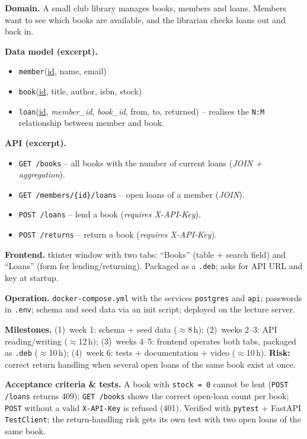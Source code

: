 \documentclass[11pt,a4paper]{article}
\begin{document}
\begin{beispielbox}
\textbf{Domain.} A small club library manages books, members and loans. Members
want to see which books are available, and the librarian checks loans out and
back in.

\medskip
\textbf{Data model (excerpt).}
\begin{itemize}[leftmargin=1.4em, topsep=2pt]
  \item \texttt{member}(\underline{id}, name, email)
  \item \texttt{book}(\underline{id}, title, author, isbn, stock)
  \item \texttt{loan}(\underline{id}, \emph{member\_id}, \emph{book\_id},
        from, to, returned) -- realises the \texttt{N:M} relationship between
        member and book.
\end{itemize}

\textbf{API (excerpt).}
\begin{itemize}[leftmargin=1.4em, topsep=2pt]
  \item \texttt{GET /books} -- all books with the number of current loans
        (\emph{JOIN + aggregation}).
  \item \texttt{GET /members/\{id\}/loans} -- open loans of a member
        (\emph{JOIN}).
  \item \texttt{POST /loans} -- lend a book (\emph{requires X-API-Key}).
  \item \texttt{POST /returns} -- return a book (\emph{requires X-API-Key}).
\end{itemize}

\textbf{Frontend.} tkinter window with two tabs: ``Books'' (table + search
field) and ``Loans'' (form for lending/returning). Packaged as a \texttt{.deb};
asks for API URL and key at startup.

\medskip
\textbf{Operation.} \texttt{docker-compose.yml} with the services
\texttt{postgres} and \texttt{api}; passwords in \texttt{.env}; schema and seed
data via an init script; deployed on the lecture server.

\medskip
\textbf{Milestones.} (1)~week 1: schema + seed data ($\approx$8\,h);
(2)~weeks 2--3: API reading/writing ($\approx$12\,h); (3)~weeks 4--5: frontend
operates both tabs, packaged as \texttt{.deb} ($\approx$10\,h); (4)~week 6:
tests + documentation + video ($\approx$10\,h). \textbf{Risk:} correct return
handling when several open loans of the same book exist at once.

\medskip
\textbf{Acceptance criteria \& tests.} A book with \texttt{stock\,=\,0} cannot be
lent (\texttt{POST /loans} returns 409); \texttt{GET /books} shows the correct
open-loan count per book; \texttt{POST} without a valid \texttt{X-API-Key} is
refused (401). Verified with \texttt{pytest} + FastAPI \texttt{TestClient}; the
return-handling risk gets its own test with two open loans of the same book.
\end{beispielbox}
\end{document}
